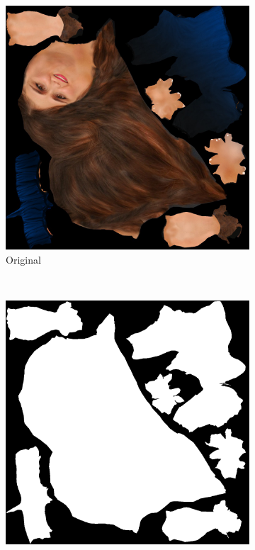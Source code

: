 \begin{figure}[h]
  \centering
  \begin{subfigure}[b]{.3\textwidth}
    \includegraphics[width=\textwidth]{figures/woman_input.jpg}
    \caption{Original}
    \label{fig:original_texture_atlas}
  \end{subfigure}
  ~
  \begin{subfigure}[b]{.3\textwidth}
    \includegraphics[width=\textwidth]{figures/woman_bound.png}

\end{subfigure}
\end{figure}
